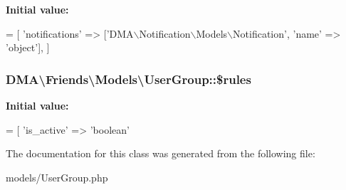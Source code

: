 {\bfseries Initial value\+:}
\begin{DoxyCode}
= [
        \textcolor{stringliteral}{'notifications'}  => [\textcolor{stringliteral}{'DMA\(\backslash\)Notification\(\backslash\)Models\(\backslash\)Notification'}, \textcolor{stringliteral}{'name'} => \textcolor{stringliteral}{'object'}],
    ]
\end{DoxyCode}
\hypertarget{classDMA_1_1Friends_1_1Models_1_1UserGroup_afe3638379efd008d908f38c86b434c76}{
\subsubsection[{\$rules}]{\setlength{\rightskip}{0pt plus 5cm}D\+M\+A\textbackslash{}\+Friends\textbackslash{}\+Models\textbackslash{}\+User\+Group\+::\$rules}}\label{classDMA_1_1Friends_1_1Models_1_1UserGroup_afe3638379efd008d908f38c86b434c76}
{\bfseries Initial value\+:}
\begin{DoxyCode}
= [
        \textcolor{stringliteral}{'is\_active'} => \textcolor{stringliteral}{'boolean'}
\end{DoxyCode}


The documentation for this class was generated from the following file\+:\begin{DoxyCompactItemize}
\item 
models/User\+Group.\+php\end{DoxyCompactItemize}
